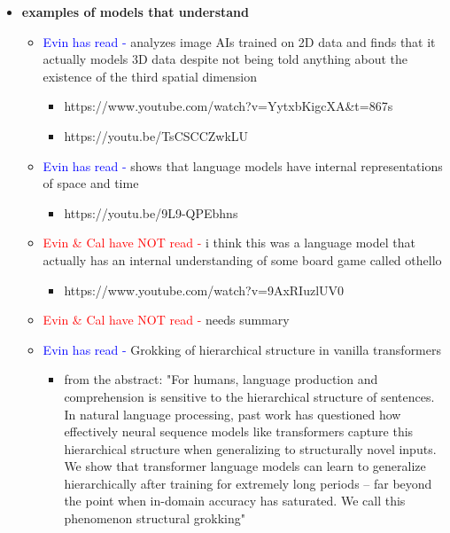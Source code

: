 \documentclass{article}
\begin{document}
\begin{itemize}
    \item \textbf{examples of models that understand}
    \begin{itemize}
        \item \textcolor{blue}{Evin has read -} \cite{chen2023beyond} analyzes image AIs trained on 2D data and finds that it actually models 3D data despite not being told anything about the existence of the third spatial dimension
        \begin{itemize}
            \item https://www.youtube.com/watch?v=YytxbKigcXA\&t=867s
            \item https://youtu.be/TsCSCCZwkLU
        \end{itemize}
        \item \textcolor{blue}{Evin has read -} \cite{tegmark2023spacetime} shows that language models have internal representations of space and time
        \begin{itemize}
            \item https://youtu.be/9L9-QPEbhns
        \end{itemize}
        \item \textcolor{red}{Evin \& Cal have NOT read - }\cite{hazineh2023linear} i think this was a language model that actually has an internal understanding of some board game called othello
        \begin{itemize}
            \item https://www.youtube.com/watch?v=9AxRIuzlUV0
        \end{itemize}
        \item \textcolor{red}{Evin \& Cal have NOT read - }\cite{abdou2021can} {needs summary}
        \item \textcolor{blue}{Evin has read -} \cite{murty2023grokking} Grokking of hierarchical structure in vanilla transformers
        \begin{itemize}
            \item from the abstract: "For humans, language production and comprehension is sensitive to the hierarchical structure of sentences. In natural language processing, past work has questioned how effectively neural sequence models like transformers capture this hierarchical structure when generalizing to structurally novel inputs. We show that transformer language models can learn to generalize hierarchically after training for extremely long periods -- far beyond the point when in-domain accuracy has saturated. We call this phenomenon structural grokking"

\end{itemize}
\end{itemize}
\end{itemize}
\end{document}
